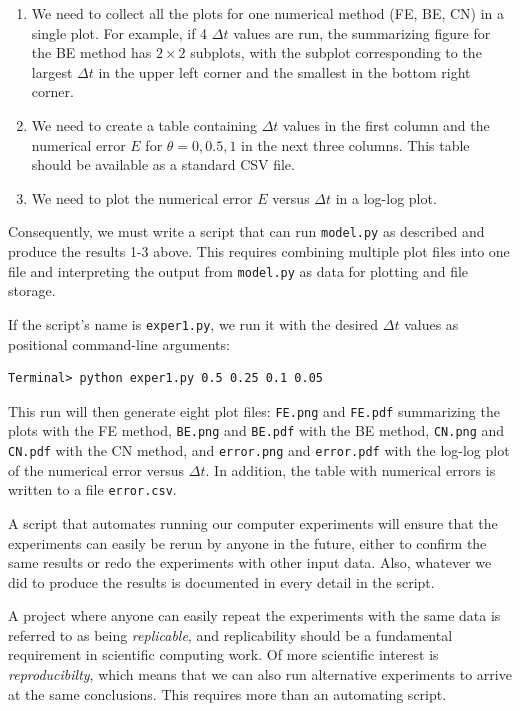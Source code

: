 \documentclass[%
oneside,                 %
final,                   %
10pt]{article}
\newenvironment{warning_mdfboxadmon}[1][]{
\begin{warning_mdfboxmdframed}[frametitle=#1]
}
{
\end{warning_mdfboxmdframed}
}
\begin{document}
\begin{enumerate}
\item We need to collect all the plots for one
   numerical method (FE, BE, CN) in a single plot.
   For example, if 4 $\Delta t$ values are run, the summarizing figure
   for the BE method has $2\times 2$ subplots, with the subplot corresponding
   to the largest $\Delta t$ in the upper left corner and the smallest
   in the bottom right corner.

\item We need to create a table containing
   $\Delta t$ values in the first column and the numerical error
   $E$ for $\theta=0,0.5,1$
   in the next three columns. This table should be available as a
   standard CSV file.

\item We need to plot the numerical error $E$ versus $\Delta t$
   in a log-log plot.
\end{enumerate}

\noindent
Consequently, we must write a script that can run \texttt{model.py} as described and
produce the results 1-3 above. This requires combining multiple plot files into
one file and interpreting the output from \texttt{model.py} as data for plotting and
file storage.

If the script's name is \texttt{exper1.py}, we run it with the desired $\Delta t$
values as positional command-line arguments:

\begin{Verbatim}[frame=lines,label=\fbox{{\tiny Terminal}},framesep=2.5mm,framerule=0.7pt,fontsize=\fontsize{9pt}{9pt}]
Terminal> python exper1.py 0.5 0.25 0.1 0.05
\end{Verbatim}
This run will then generate eight plot files: \texttt{FE.png} and \texttt{FE.pdf} summarizing
the plots with the FE method, \texttt{BE.png} and \texttt{BE.pdf} with
the BE method, \texttt{CN.png} and \texttt{CN.pdf} with the CN method, and \texttt{error.png}
and \texttt{error.pdf} with the log-log plot of the numerical error versus $\Delta t$.
In addition, the table with numerical errors is written to a
file \texttt{error.csv}.



\begin{warning_mdfboxadmon}
A script that automates running our computer experiments
will ensure
that the experiments can easily be rerun by anyone in
the future, either to confirm the same results or redo the experiments with
other input data.
Also, whatever we did to produce the results is
documented in every detail in the script.

A project where anyone can easily repeat the experiments with the same data
is referred to as being \emph{replicable}, and replicability
should be a fundamental requirement in scientific computing work.
Of more scientific interest is \emph{reproducibilty}, which means that we can
also run alternative experiments to arrive at the same conclusions.
This requires more than an automating script.
\end{warning_mdfboxadmon}
\end{document}
